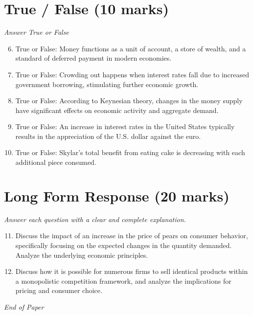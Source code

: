 \documentclass[12pt]{article}
\begin{document}
\section*{True / False (10 marks)}
\textit{Answer True or False}
\begin{enumerate}[label=\arabic*.]
\setcounter{enumi}{5}
\item True or False: Money functions as a unit of account, a store of wealth, and a standard of deferred payment in modern economies.
\item True or False: Crowding out happens when interest rates fall due to increased government borrowing, stimulating further economic growth.
\item True or False: According to Keynesian theory, changes in the money supply have significant effects on economic activity and aggregate demand.
\item True or False: An increase in interest rates in the United States typically results in the appreciation of the U.S. dollar against the euro.
\item True or False: Skylar's total benefit from eating cake is decreasing with each additional piece consumed.
\end{enumerate}

\section*{Long Form Response (20 marks)}
\textit{Answer each question with a clear and complete explanation.}
\begin{enumerate}[label=\arabic*.]
\setcounter{enumi}{10}
\item Discuss the impact of an increase in the price of pears on consumer behavior, specifically focusing on the expected changes in the quantity demanded. Analyze the underlying economic principles.
\item Discuss how it is possible for numerous firms to sell identical products within a monopolistic competition framework, and analyze the implications for pricing and consumer choice.
\end{enumerate}

\vfill
\noindent\textit{End of Paper}
\end{document}
